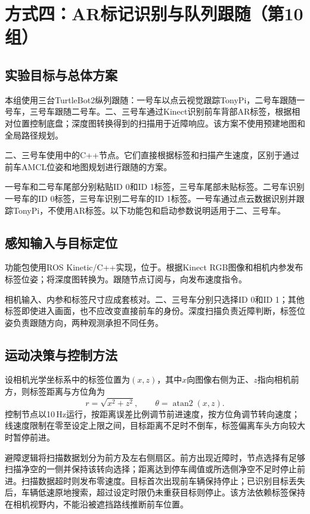\section{方式四：AR标记识别与队列跟随（第10组）}
\subsection{实验目标与总体方案}
本组使用三台TurtleBot2纵列跟随：一号车以点云视觉跟踪TonyPi，二号车跟随一号车，三号车跟随二号车。二、三号车通过Kinect识别前车背部AR标签，根据相对位置控制底盘；深度图转换得到的扫描用于近障响应。该方案不使用预建地图和全局路径规划。

二、三号车使用中的C++节点。它们直接根据标签和扫描产生速度，区别于通过前车AMCL位姿和地图规划进行跟随的方案。

一号车和二号车尾部分别粘贴ID 0和ID 1标签，三号车尾部未贴标签。二号车识别一号车的ID 0标签，三号车识别二号车的ID 1标签。一号车通过点云数据识别并跟踪TonyPi，不使用AR标签。以下功能包和启动参数说明适用于二、三号车。

\subsection{感知输入与目标定位}
功能包使用ROS Kinetic/C++实现，位于。根据Kinect RGB图像和相机内参发布标签位姿；将深度图转换为。跟随节点订阅与，向发布速度指令。


相机输入、内参和标签尺寸应成套核对。二、三号车分别只选择ID 0和ID 1；其他标签即使进入画面，也不应改变直接前车的身份。深度扫描负责近障判断，标签位姿负责跟随方向，两种观测承担不同任务。

\subsection{运动决策与控制方法}
设相机光学坐标系中的标签位置为$(x,z)$，其中$x$向图像右侧为正、$z$指向相机前方，则标签距离与方位角为
\begin{equation}
 r=\sqrt{x^2+z^2},\qquad \theta=\operatorname{atan2}(x,z).
\end{equation}
控制节点以10\,Hz运行，按距离误差比例调节前进速度，按方位角调节转向速度；线速度限制在零至设定上限之间，目标距离不足时不倒车，标签偏离车头方向较大时暂停前进。

避障逻辑将扫描数据划分为前方及左右侧扇区。前方出现近障时，节点选择有足够扫描净空的一侧并保持该转向选择；距离达到停车阈值或所选侧净空不足时停止前进。扫描数据超时则发布零速度。目标首次出现前车辆保持停止；已识别目标丢失后，车辆低速原地搜索，超过设定时限仍未重获目标则停止。该方法依赖标签保持在相机视野内，不能沿被遮挡路线推断前车位置。

